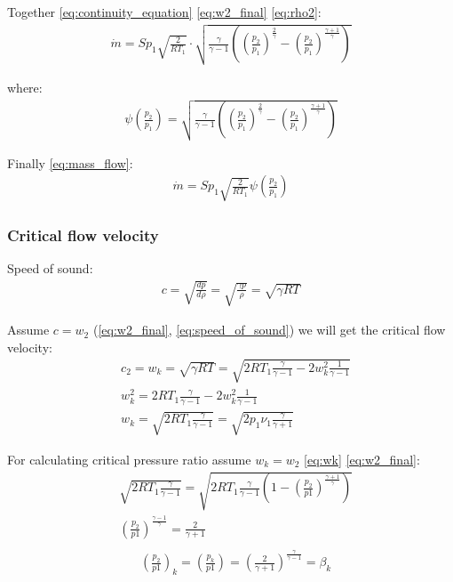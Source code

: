 \documentclass[class=article, crop=false]{standalone}
\begin{document}
Together \ref{eq:continuity_equation} \ref{eq:w2_final} \ref{eq:rho2}:
\begin{align}
    \dot{m} = S p_1 \sqrt{\frac{2}{RT_1}} \cdot
    \sqrt{\frac{\gamma}{\gamma-1}\left(\left(\frac{p_2}{p_1}\right)^\frac{2}{\gamma} -
    \left(\frac{p_2}{p_1}\right)^\frac{\gamma + 1}{\gamma}\right)}
    \label{}
\end{align}

where: 
\begin{align}
    \psi\left(\frac{p_2}{p_1}\right) =  
    \sqrt{\frac{\gamma}{\gamma-1}\left(\left(\frac{p_2}{p_1}\right)^\frac{2}{\gamma} -
    \left(\frac{p_2}{p_1}\right)^\frac{\gamma + 1}{\gamma}\right)}
    \label{eq:psi}
\end{align}

Finally \ref{eq:mass_flow}:
\begin{align}
    \dot{m} = Sp_1\sqrt{\frac{2}{RT_1}} \psi\left(\frac{p_2}{p_1}\right)
    \label{eq:mass_flow}
\end{align}

\subsubsection{Critical flow velocity}
Speed of sound:
\begin{align}
    c = \sqrt{\frac{dp}{d\rho}} = 
    \sqrt{\frac{\gamma p}{\rho}} = \sqrt{\gamma R T}
    \label{eq:speed_of_sound}
\end{align}

Assume $c=w_2$ (\ref{eq:w2_final}, \ref{eq:speed_of_sound}) we will get the
critical flow velocity:
\begin{align}
    &c_2 = w_k = \sqrt{\gamma RT} =
    \sqrt{2RT_1\frac{\gamma}{\gamma-1}-2w_k^2\frac{1}{\gamma-1}} \\
    &w_k^2 = 2RT_1\frac{\gamma}{\gamma-1}-2w_k^2\frac{1}{\gamma-1} \\
    &w_k = \sqrt{2RT_1\frac{\gamma}{\gamma-1}} = \sqrt{2p_1 \nu_1 \frac{\gamma}{\gamma + 1}}
    \label{eq:wk}
\end{align}


For calculating critical pressure ratio assume $w_k = w_2$ \ref{eq:wk}
\ref{eq:w2_final}:
\begin{align}
    &\sqrt{2RT_1\frac{\gamma}{\gamma-1}}  = 
    \sqrt{2RT_1 \frac{\gamma}{\gamma-1}
    \left(1-\left(\frac{p_2}{p1}\right)^{\frac{\gamma+1}{\gamma}}\right)} \\
    &\left(\frac{p_2}{p1}\right)^\frac{\gamma-1}{\gamma} = \frac{2}{\gamma+1} \\
\end{align}
\begin{align}
    &\left(\frac{p_2}{p1}\right)_k =
    \left(\frac{p_k}{p1}\right) =
    \left(\frac{2}{\gamma+1}\right)^\frac{\gamma}{\gamma-1}=\beta_k
    \label{eq:beta_k}
\end{align}
\end{document}
